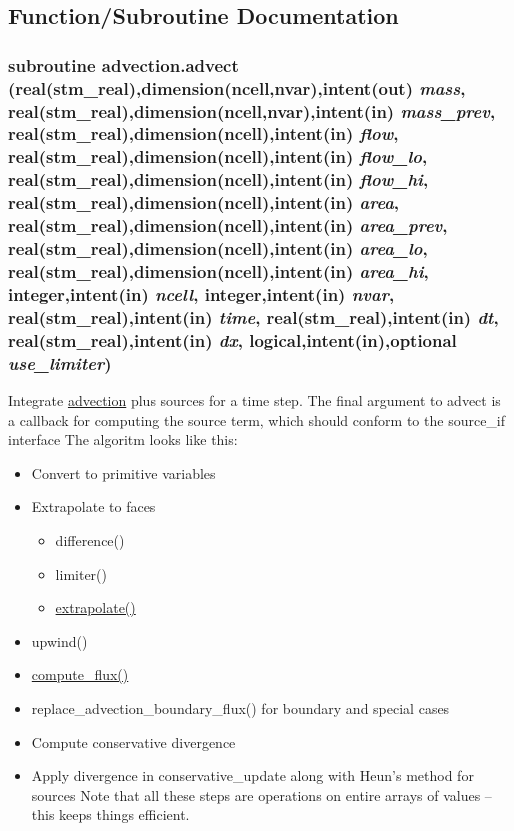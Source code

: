 \subsection{Function/Subroutine Documentation}
\hypertarget{a00052_9ec45d9c2fabe0abb0a60795bc228f59}{
\subsubsection[{advect}]{\setlength{\rightskip}{0pt plus 5cm}subroutine advection.advect (real(stm\_\-real),dimension(ncell,nvar),intent(out) {\em mass}, \/  real(stm\_\-real),dimension(ncell,nvar),intent(in) {\em mass\_\-prev}, \/  real(stm\_\-real),dimension(ncell),intent(in) {\em flow}, \/  real(stm\_\-real),dimension(ncell),intent(in) {\em flow\_\-lo}, \/  real(stm\_\-real),dimension(ncell),intent(in) {\em flow\_\-hi}, \/  real(stm\_\-real),dimension(ncell),intent(in) {\em area}, \/  real(stm\_\-real),dimension(ncell),intent(in) {\em area\_\-prev}, \/  real(stm\_\-real),dimension(ncell),intent(in) {\em area\_\-lo}, \/  real(stm\_\-real),dimension(ncell),intent(in) {\em area\_\-hi}, \/  integer,intent(in) {\em ncell}, \/  integer,intent(in) {\em nvar}, \/  real(stm\_\-real),intent(in) {\em time}, \/  real(stm\_\-real),intent(in) {\em dt}, \/  real(stm\_\-real),intent(in) {\em dx}, \/  logical,intent(in),optional {\em use\_\-limiter})}}
\label{a00052_9ec45d9c2fabe0abb0a60795bc228f59}


Integrate \hyperlink{a00052}{advection} plus sources for a time step. The final argument to advect is a callback for computing the source term, which should conform to the source\_\-if interface The algoritm looks like this:\begin{itemize}
\item Convert to primitive variables\item Extrapolate to faces\begin{itemize}
\item difference()\item limiter()\item \hyperlink{a00052_36ba824cb5dc6ca6127866376d2e79ec}{extrapolate()}\end{itemize}
\item upwind()\item \hyperlink{a00052_3947a8a29b1c666b2d1b7223215e9873}{compute\_\-flux()}\item replace\_\-advection\_\-boundary\_\-flux() for boundary and special cases\item Compute conservative divergence\item Apply divergence in conservative\_\-update along with Heun's method for sources Note that all these steps are operations on entire arrays of values -- this keeps things efficient. \end{itemize}


